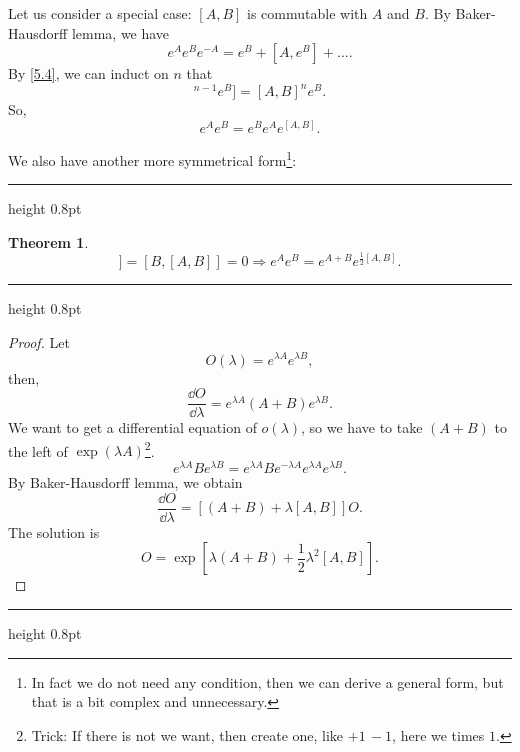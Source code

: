 \documentclass{article}
\newcommand{\singleline}{\hrule height 0.8pt}
\theoremstyle{1}
\newtheorem{theorem}[problem]{Theorem}
\begin{document}
Let us consider a special case: $[A,B]$ is  commutable with $A$ and $B$. By Baker-Hausdorff lemma, we have
\begin{equation}
    e^Ae^Be^{-A}=e^B+[A,e^B]+\dots.
\end{equation}
By \eqref{5.4}, we can induct on $n$ that 
\begin{equation}
    [A,[A,B]^{n-1}e^B]=[A,B]^ne^B.
\end{equation}
So, 
\begin{equation}\label{9.13}
    e^Ae^B=e^Be^Ae^{[A,B]}.
\end{equation}


We also have another more symmetrical form\footnote{In fact we do not need any condition, then we can derive a general form, but that is a bit complex and unnecessary.}:

\singleline

\begin{theorem}

    \begin{equation}
         [A,[A,B]]=[B,[A,B]]=0\Rightarrow e^A e^B = e^{A + B} e^{\frac{1}{2}[A, B]}.
    \end{equation}
\end{theorem}
\singleline
\begin{proof}
    Let 
    \begin{equation}
        O(\lambda)=e^{\lambda A}e^{\lambda B},
    \end{equation}
    then,
    \begin{equation}
        \frac{\dd{O}}{\dd{\lambda}}=e^{\lambda A}\left(A+B\right)e^{\lambda B}.
    \end{equation}
    We want to get a differential equation of $o(\lambda)$, so we have to take $(A+B)$ to the left of $\exp(\lambda A)$\footnote{Trick: If there is not we want, then create one, like $+1\, -1$, here we times $1$.}.
    \begin{equation}
        e^{\lambda A}Be^{\lambda B}=e^{\lambda A}Be^{-\lambda A}e^{\lambda A}e^{\lambda B}.
    \end{equation}
    By Baker-Hausdorff lemma, we obtain
    \begin{equation}
        \frac{\dd{O}}{\dd{\lambda}}=\left[\left(A+B\right)+\lambda[A,B]\right]O.
    \end{equation}
    The solution is 
    \begin{equation}
        O=\exp\left[\lambda(A+B)+\frac{1}{2}\lambda^2[A,B]\right].
    \end{equation}
\end{proof}
\singleline
\end{document}
